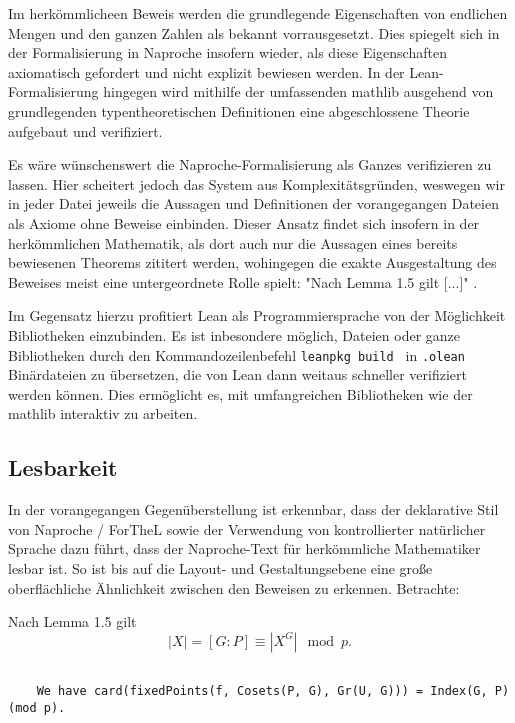 \documentclass[a4paper,12pt]{scrartcl}
\begin{document}
Im herkömmlicheen Beweis \cite{bibtex.a}  werden die grundlegende Eigenschaften von endlichen Mengen und den ganzen Zahlen als bekannt vorrausgesetzt. Dies spiegelt sich in der Formalisierung in Naproche insofern wieder, als diese Eigenschaften axiomatisch gefordert und nicht explizit bewiesen werden. In der Lean-Formalisierung hingegen wird mithilfe der umfassenden mathlib ausgehend von grundlegenden typentheoretischen Definitionen eine abgeschlossene Theorie aufgebaut und verifiziert.

Es wäre wünschenswert die Naproche-Formalisierung als Ganzes verifizieren zu lassen. Hier scheitert jedoch das System aus Komplexitätsgründen, weswegen wir in jeder Datei jeweils die Aussagen und Definitionen der vorangegangen Dateien als Axiome ohne Beweise einbinden. Dieser Ansatz findet sich insofern in der herkömmlichen Mathematik, als dort auch nur die Aussagen eines bereits bewiesenen Theorems zititert werden, wohingegen die exakte Ausgestaltung des Beweises meist eine untergeordnete Rolle spielt: "Nach Lemma 1.5 gilt [...]" \cite{bibtex.a}.

Im Gegensatz hierzu profitiert Lean als Programmiersprache von der Möglichkeit Bibliotheken einzubinden. Es ist inbesondere möglich, Dateien oder ganze Bibliotheken durch den Kommandozeilenbefehl \verb!leanpkg build ! in  \verb!.olean! Binärdateien zu übersetzen, die von Lean dann weitaus schneller verifiziert werden können. Dies ermöglicht es, mit umfangreichen Bibliotheken wie der mathlib \cite{bibtex.d} interaktiv zu arbeiten.

\subsection{Lesbarkeit}
In der vorangegangen Gegenüberstellung ist erkennbar, dass der deklarative Stil von Naproche / ForTheL sowie der Verwendung von kontrollierter natürlicher Sprache dazu führt, dass der Naproche-Text für herkömmliche Mathematiker lesbar ist. So ist bis auf die Layout- und Gestaltungsebene eine große oberflächliche Ähnlichkeit zwischen den Beweisen zu erkennen.
Betrachte:
\medskip

Nach Lemma 1.5 gilt $$|X|=[G : P]\equiv |X^{G}| \mod p.$$

\begin{lstlisting}

    We have card(fixedPoints(f, Cosets(P, G), Gr(U, G))) = Index(G, P) (mod p).

\end{lstlisting}
\end{document}
